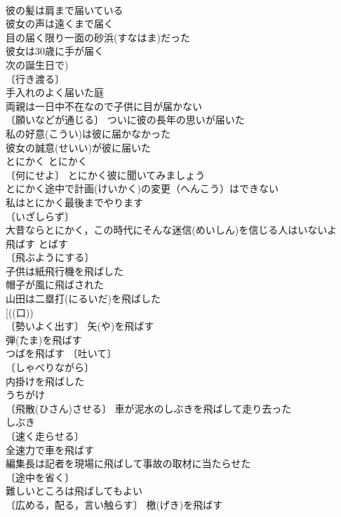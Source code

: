 \documentclass[8pt]{extreport}
\begin{document}
\begin{CJK}{UTF8}{min}
\\	彼の髪は肩まで届いている 
\\	彼女の声は遠くまで届く 
\\	目の届く限り一面の砂浜(すなはま)だった 
\\	彼女は30歳に手が届く 
\\	次の誕生日で) 
\\	〔行き渡る〕
\\	手入れのよく届いた庭 
\\	両親は一日中不在なので子供に目が届かない 
\\	〔願いなどが通じる〕 ついに彼の長年の思いが届いた 
\\	私の好意(こうい)は彼に届かなかった 
\\	彼女の誠意(せいい)が彼に届いた 
\\	とにかく	とにかく	
\\	〔何にせよ〕 とにかく彼に聞いてみましょう 
\\	とにかく途中で計画(けいかく)の変更（へんこう）はできない 
\\	私はとにかく最後までやります 
\\	〔いざしらず〕
\\	大昔ならとにかく，この時代にそんな迷信(めいしん)を信じる人はいないよ 
\\	飛ばす	とばす 
\\	〔飛ぶようにする〕
\\	子供は紙飛行機を飛ばした 
\\	帽子が風に飛ばされた 
\\	山田は二塁打(にるいだ)を飛ばした 
\\	[((口))
\\	〔勢いよく出す〕 矢(や)を飛ばす 
\\	弾(たま)を飛ばす 
\\	つばを飛ばす 〔吐いて〕
\\	〔しゃべりながら〕
\\	内掛けを飛ばした 
\\	うちがけ　
\\	〔飛散(ひさん)させる〕 車が泥水のしぶきを飛ばして走り去った 
\\	しぶき　
\\	〔速く走らせる〕
\\	全速力で車を飛ばす 
\\	編集長は記者を現場に飛ばして事故の取材に当たらせた 
\\	〔途中を省く〕
\\	難しいところは飛ばしてもよい 
\\	〔広める，配る，言い触らす〕 檄(げき)を飛ばす 

\end{CJK}
\end{document}
